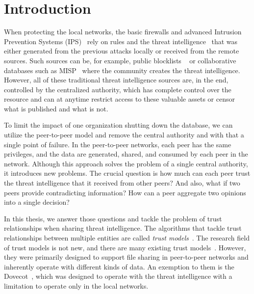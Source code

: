 \chapter{Introduction}
\label{ch:introduction}



When protecting the local networks, the basic firewalls and advanced Intrusion Prevention Systems (IPS)~\cite{zhang2004intrusion} rely on rules and the threat intelligence~\cite{threatintelligence} that was either generated from the previous attacks locally or received from the remote sources.
Such sources can be, for example, public blocklists ~\cite{abuseipdb, binarydefense, dataplane} or collaborative databases such as MISP~\cite{wagner2016misp} where the community creates the threat intelligence.
However, all of these traditional threat intelligence sources are, in the end, controlled by the centralized authority, which has complete control over the resource and can at anytime restrict access to these valuable assets or censor what is published and what is not.

To limit the impact of one organization shutting down the database, we can utilize the peer-to-peer model and remove the central authority and with that a single point of failure.
In the peer-to-peer networks, each peer has the same privileges, and the data are generated, shared, and consumed by each peer in the network.
Although this approach solves the problem of a single central authority, it introduces new problems. The crucial question is how much can each peer trust the threat intelligence that it received from other peers? And also, what if two peers provide contradicting information? How can a peer aggregate two opinions into a single decision?

In this thesis, we answer those questions and tackle the problem of trust relationships when sharing threat intelligence.
The algorithms that tackle trust relationships between multiple entities are called \textit{trust models}~\cite{wang2003trust}.
The research field of trust models is not new, and there are many existing trust models~\cite{kamvar2003eigentrust, xiong2004peertrust, 1562680, huynh2006integrated, sort, pinyol2013computational, christensen2014hybrid,li2014design, abera2019sadan}.
However, they were primarily designed to support file sharing in peer-to-peer networks and inherently operate with different kinds of data.
An exemption to them is the Dovecot~\cite{dita}, which was designed to operate with the threat intelligence with a limitation to operate only in the local networks.

